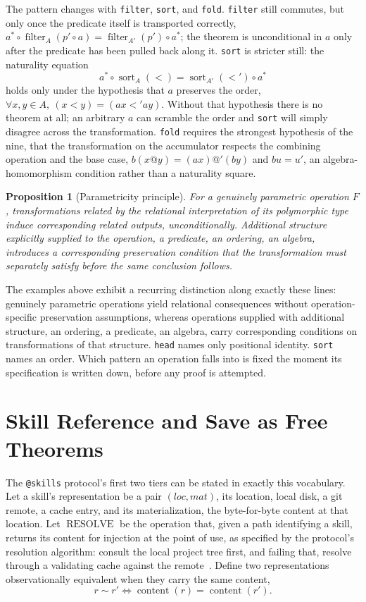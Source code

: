 \documentclass[11pt]{article}
\newtheorem{proposition}{Proposition}
\begin{document}
The pattern changes with \texttt{filter}, \texttt{sort}, and \texttt{fold}. \texttt{filter} still commutes, but only once the predicate itself is transported correctly, $a^* \circ \operatorname{filter}_A(p' \circ a) = \operatorname{filter}_{A'}(p') \circ a^*$; the theorem is unconditional in $a$ only after the predicate has been pulled back along it. \texttt{sort} is stricter still: the naturality equation
\[
a^* \circ \operatorname{sort}_A({<}) = \operatorname{sort}_{A'}({<'}) \circ a^*
\]
holds only under the hypothesis that $a$ preserves the order, $\forall x, y \in A,\ (x < y) = (ax <' ay)$. Without that hypothesis there is no theorem at all; an arbitrary $a$ can scramble the order and \texttt{sort} will simply disagree across the transformation. \texttt{fold} requires the strongest hypothesis of the nine, that the transformation on the accumulator respects the combining operation and the base case, $b(x @ y) = (ax) @' (by)$ and $bu = u'$, an algebra-homomorphism condition rather than a naturality square.

\begin{proposition}[Parametricity principle]
For a genuinely parametric operation $F$, transformations related by the relational interpretation of its polymorphic type induce corresponding related outputs, unconditionally. Additional structure explicitly supplied to the operation, a predicate, an ordering, an algebra, introduces a corresponding preservation condition that the transformation must separately satisfy before the same conclusion follows.
\end{proposition}

The examples above exhibit a recurring distinction along exactly these lines: genuinely parametric operations yield relational consequences without operation-specific preservation assumptions, whereas operations supplied with additional structure, an ordering, a predicate, an algebra, carry corresponding conditions on transformations of that structure. \texttt{head} names only positional identity. \texttt{sort} names an order. Which pattern an operation falls into is fixed the moment its specification is written down, before any proof is attempted.

\section{Skill Reference and Save as Free Theorems}
\label{sec:reference-save}

The \texttt{@skills} protocol's first two tiers can be stated in exactly this vocabulary. Let a skill's representation be a pair $(loc, mat)$, its location, local disk, a git remote, a cache entry, and its materialization, the byte-for-byte content at that location. Let $\operatorname{RESOLVE}$ be the operation that, given a path identifying a skill, returns its content for injection at the point of use, as specified by the protocol's resolution algorithm: consult the local project tree first, and failing that, resolve through a validating cache against the remote~\cite{skills2026}. Define two representations observationally equivalent when they carry the same content,
\[
r \sim r' \iff \operatorname{content}(r) = \operatorname{content}(r').
\]
\end{document}
